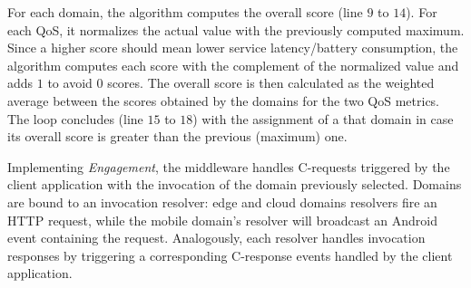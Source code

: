 For each domain, the algorithm computes the overall score (line $9$ to $14$). For each QoS, it normalizes the actual value with the previously computed maximum.
Since a higher score should mean lower service latency/battery consumption, the algorithm computes each score with the complement of the normalized value and adds $1$ to avoid $0$ scores. 
The overall score is then calculated as the weighted average between the scores obtained by the domains for the two QoS metrics. The loop concludes (line $15$ to $18$) with the assignment of a that domain in case its overall score is greater than the previous (maximum) one.  

%


Implementing \textit{Engagement}, the middleware handles C-requests triggered by the client application 
with the invocation of the domain previously selected. Domains are bound to an invocation resolver: edge and cloud domains resolvers fire an HTTP request, while the mobile domain's resolver will broadcast an Android event containing the request. Analogously, each resolver handles invocation responses by triggering a corresponding C-response events handled by the client application.
